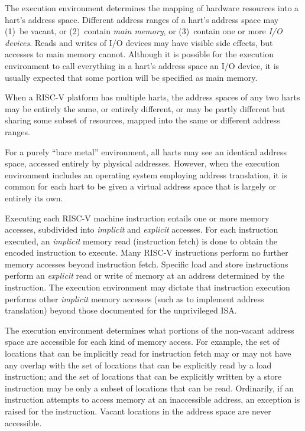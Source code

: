 The execution environment determines the mapping of hardware resources into
a hart's address space.
Different address ranges of a hart's address space may (1)~be vacant, or
(2)~contain {\em main memory}, or (3)~contain one or more {\em I/O devices}.
Reads and writes of I/O devices may have visible side effects, but accesses
to main memory cannot.
Although it is possible for the execution environment to call everything in
a hart's address space an I/O device, it is usually expected that some
portion will be specified as main memory.

When a RISC-V platform has multiple harts, the address spaces of any two
harts may be entirely the same, or entirely different, or may be partly
different but sharing some subset of resources, mapped into the same or
different address ranges.

\begin{commentary}
For a purely ``bare metal'' environment, all harts may see an identical
address space, accessed entirely by physical addresses.
However, when the execution environment includes an operating system
employing address translation, it is common for each hart to be given a
virtual address space that is largely or entirely its own.
\end{commentary}

Executing each RISC-V machine instruction entails one or more memory
accesses, subdivided into {\em
implicit} and {\em explicit} accesses.  For each instruction executed, an {\em
implicit} memory read (instruction fetch) is done to obtain the encoded
instruction to execute.  Many RISC-V instructions perform no further memory
accesses beyond instruction fetch.  Specific load and store instructions
perform an {\em explicit} read or write of memory at an address determined by
the instruction.  The execution environment may dictate that instruction
execution performs other {\em implicit} memory accesses (such as to implement
address translation) beyond those documented for the unprivileged ISA.

The execution environment determines what portions of the
non-vacant address space are
accessible for each kind of memory access.  For example, the set of locations
that can be implicitly read for instruction fetch may or may not have any
overlap with the set of locations that can be explicitly read by a load
instruction; and the set of locations that can be explicitly written by
a store instruction may be only a subset of locations that can be read.
Ordinarily, if an instruction attempts to access memory at an inaccessible
address, an exception is raised for the instruction.
Vacant locations in the address space are never accessible.

